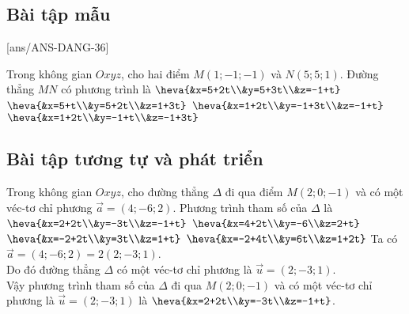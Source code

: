 \subsection{Bài tập mẫu}
[ans/ANS-DANG-36]
\begin{khung}
	\begin{vd}%
Trong không gian $Oxyz$, cho hai điểm $M(1;-1;-1)$ và $N(5;5;1)$. Đường thẳng $MN$ có phương trình là
		\choice
		{$\heva{&x=5+2t\\&y=5+3t\\&z=-1+t}$}	
		{$\heva{&x=5+t\\&y=5+2t\\&z=1+3t}$}
		{\True $\heva{&x=1+2t\\&y=-1+3t\\&z=-1+t}$}	
		{$\heva{&x=1+2t\\&y=-1+t\\&z=-1+3t}$}
	\end{vd}
\end{khung}
\subsection{Bài tập tương tự và phát triển}
\begin{ex}%
	Trong không gian $O x y z$, cho đường thẳng $\Delta$ đi qua điểm $M(2;0;-1)$ và có một véc-tơ chỉ phương $\vec{a}=(4;-6;2)$. Phương trình tham số của $\Delta$ là 
	\choice 
	{\True $\heva{&x=2+2t\\&y=-3t\\&z=-1+t}$}
	{$\heva{&x=4+2t\\&y=-6\\&z=2+t}$}
	{$\heva{&x=-2+2t\\&y=3t\\&z=1+t}$}
	{$\heva{&x=-2+4t\\&y=6t\\&z=1+2t}$}
					\loigiai 
					{
Ta có $\vec{a}=(4;-6;2)=2(2;-3;1)$.\\
Do đó đường thẳng $\Delta$ có một véc-tơ chỉ phương là $\vec{u}=(2;-3;1)$.\\
Vậy phương trình tham số của $\Delta$ đi qua $M(2;0;-1)$ và có một véc-tơ chỉ phương là $\vec{u}=(2;-3;1)$ là $\heva{&x=2+2t\\&y=-3t\\&z=-1+t}$.\\
					}
\end{ex}

